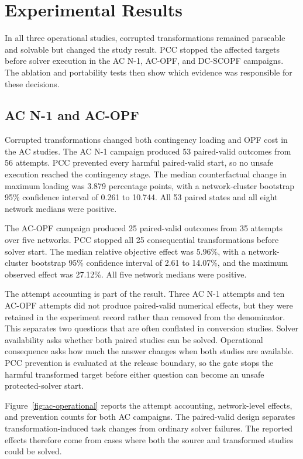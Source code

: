 \documentclass[preprint,12pt]{elsarticle}
\begin{document}
\section{Experimental Results}
In all three operational studies, corrupted transformations remained parseable and solvable but changed the study result. PCC stopped the affected targets before solver execution in the AC N-1, AC-OPF, and DC-SCOPF campaigns. The ablation and portability tests then show which evidence was responsible for these decisions.

\subsection{AC N-1 and AC-OPF}

Corrupted transformations changed both contingency loading and OPF cost in the AC studies. The AC N-1 campaign produced 53 paired-valid outcomes from 56 attempts. PCC prevented every harmful paired-valid start, so no unsafe execution reached the contingency stage. The median counterfactual change in maximum loading was 3.879 percentage points, with a network-cluster bootstrap 95\% confidence interval of 0.261 to 10.744. All 53 paired states and all eight network medians were positive.

The AC-OPF campaign produced 25 paired-valid outcomes from 35 attempts over five networks. PCC stopped all 25 consequential transformations before solver start. The median relative objective effect was 5.96\%, with a network-cluster bootstrap 95\% confidence interval of 2.61 to 14.07\%, and the maximum observed effect was 27.12\%. All five network medians were positive.

The attempt accounting is part of the result. Three AC N-1 attempts and ten AC-OPF attempts did not produce paired-valid numerical effects, but they were retained in the experiment record rather than removed from the denominator. This separates two questions that are often conflated in conversion studies. Solver availability asks whether both paired studies can be solved. Operational consequence asks how much the answer changes when both studies are available. PCC prevention is evaluated at the release boundary, so the gate stops the harmful transformed target before either question can become an unsafe protected-solver start.

Figure~\ref{fig:ac-operational} reports the attempt accounting, network-level effects, and prevention counts for both AC campaigns. The paired-valid design separates transformation-induced task changes from ordinary solver failures. The reported effects therefore come from cases where both the source and transformed studies could be solved.
\end{document}
